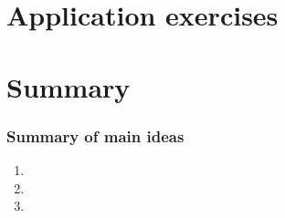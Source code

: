 \documentclass[11pt,containsverbatim,handout,xcolor=xelatex,dvipsnames,table]{beamer}
\begin{document}

\section{Application exercises}


\begin{frame}

\vfill


\vfill

\end{frame}


\section{Summary}


\begin{frame}
\frametitle{Summary of main ideas}

\vfill

\begin{enumerate}

\item {}

\item {}

\item {}

\end{enumerate}

\vfill

\end{frame}

\end{document}
